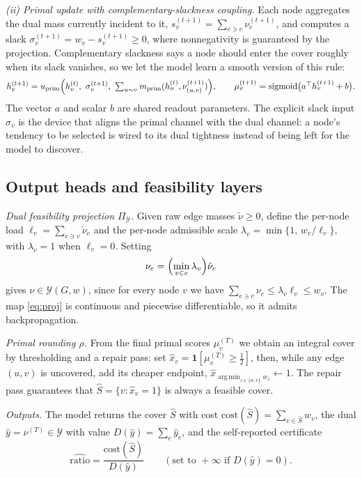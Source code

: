 \documentclass[11pt]{article}
\theoremstyle{plain}
\theoremstyle{definition}
\theoremstyle{remark}
\DeclareMathOperator*{\argmin}{arg\,min}
\newcommand{\cost}{\mathrm{cost}}
\newcommand{\Ycal}{\mathcal{Y}}
\newcommand{\ratiohat}{\widehat{\mathrm{ratio}}}
\begin{document}
\emph{(ii) Primal update with complementary-slackness coupling.} Each node
aggregates the dual mass currently incident to it, $s_v^{(t+1)}=\sum_{e\ni v}
\nu_e^{(t+1)}$, and computes a slack $\sigma_v^{(t+1)}=w_v-s_v^{(t+1)}\ge 0$,
where nonnegativity is guaranteed by the projection. Complementary slackness says
a node should enter the cover roughly when its slack vanishes, so we let the
model learn a smooth version of this rule:
\begin{equation}
h_v^{(t+1)}=u_{\mathrm{prim}}\Bigl(h_v^{(t)},\ \sigma_v^{(t+1)},\
   \textstyle\sum_{u\sim v} m_{\mathrm{prim}}(h_u^{(t)},\nu_{(u,v)}^{(t+1)})\Bigr),
\qquad \mu_v^{(t+1)}=\mathrm{sigmoid}\bigl(a^\top h_v^{(t+1)}+b\bigr). \label{eq:prim}
\end{equation}
The vector $a$ and scalar $b$ are shared readout parameters. The explicit slack
input $\sigma_v$ is the device that aligns the primal channel with the dual
channel: a node's tendency to be selected is wired to its dual tightness instead
of being left for the model to discover.

\subsection{Output heads and feasibility layers}\label{sec:heads}
\emph{Dual feasibility projection $\Pi_\Ycal$.} Given raw edge masses
$\tilde\nu\ge 0$, define the per-node load $\ell_v=\sum_{e\ni v}\tilde\nu_e$ and
the per-node admissible scale $\lambda_v=\min\{1,\,w_v/\ell_v\}$, with
$\lambda_v=1$ when $\ell_v=0$. Setting
\begin{equation}
\nu_e=\Bigl(\min_{v\in e}\lambda_v\Bigr)\tilde\nu_e \label{eq:proj}
\end{equation}
gives $\nu\in\Ycal(G,w)$, since for every node $v$ we have
$\sum_{e\ni v}\nu_e\le\lambda_v\ell_v\le w_v$. The map \eqref{eq:proj} is
continuous and piecewise differentiable, so it admits backpropagation.

\emph{Primal rounding $\rho$.} From the final primal scores $\mu_v^{(T)}$ we
obtain an integral cover by thresholding and a repair pass: set
$\hat x_v=\mathbf{1}[\mu_v^{(T)}\ge\frac12]$, then, while any edge $(u,v)$ is
uncovered, add its cheaper endpoint, $\hat x_{\argmin_{z\in\{u,v\}} w_z}\!\gets1$.
The repair pass guarantees that $\hat S=\{v:\hat x_v=1\}$ is always a feasible
cover.

\emph{Outputs.} The model returns the cover $\hat S$ with cost
$\cost(\hat S)=\sum_{v\in\hat S} w_v$, the dual $\hat y=\nu^{(T)}\in\Ycal$ with
value $D(\hat y)=\sum_e\hat y_e$, and the self-reported certificate
\begin{equation}
\ratiohat=\frac{\cost(\hat S)}{D(\hat y)}\qquad(\text{set to }+\infty\text{ if } D(\hat y)=0). \label{eq:ratio}
\end{equation}
\end{document}
